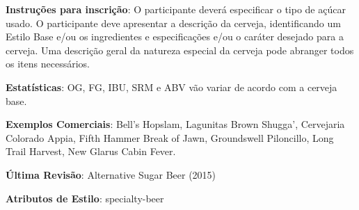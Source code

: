 \textbf{Instruções para inscrição}: O participante deverá especificar o tipo de açúcar usado. O participante deve apresentar a descrição da cerveja, identificando um Estilo Base e/ou os ingredientes e especificações e/ou o caráter desejado para a cerveja. Uma descrição geral da natureza especial da cerveja pode abranger todos os itens necessários.

\textbf{Estatísticas}: OG, FG, IBU, SRM e ABV vão variar de acordo com a cerveja base.

\textbf{Exemplos Comerciais}: Bell’s Hopslam, Lagunitas Brown Shugga’, Cervejaria Colorado Appia, Fifth Hammer Break of Jawn, Groundswell Piloncillo, Long Trail Harvest, New Glarus Cabin Fever.

\textbf{Última Revisão}: Alternative Sugar Beer (2015)

\textbf{Atributos de Estilo}: specialty-beer
